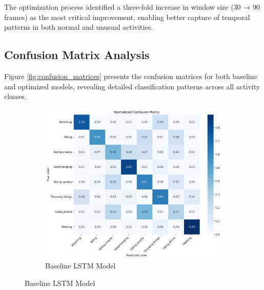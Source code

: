 \documentclass{iopconfser}
\begin{document}
The optimization process identified a three-fold increase in window size (30 → 90 frames) as the most critical improvement, enabling better capture of temporal patterns in both normal and unusual activities.

\subsection{Confusion Matrix Analysis}

Figure \ref{fig:confusion_matrices} presents the confusion matrices for both baseline and optimized models, revealing detailed classification patterns across all activity classes.

\begin{figure}[H]
\centering
\begin{subfigure}{0.7\textwidth}
    \centering
    \includegraphics[width=\textwidth]{results/metrics/baseline/confusion_matrix.png}
    \caption{Baseline LSTM Model}
    \label{fig:baseline_confusion}
\end{subfigure}

\vspace{0.5cm}


\end{figure}
\end{document}
